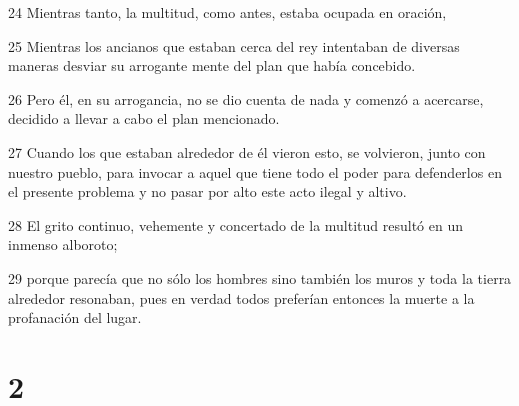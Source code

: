 \par 24 Mientras tanto, la multitud, como antes, estaba ocupada en oración,
\par 25 Mientras los ancianos que estaban cerca del rey intentaban de diversas maneras desviar su arrogante mente del plan que había concebido.
\par 26 Pero él, en su arrogancia, no se dio cuenta de nada y comenzó a acercarse, decidido a llevar a cabo el plan mencionado.
\par 27 Cuando los que estaban alrededor de él vieron esto, se volvieron, junto con nuestro pueblo, para invocar a aquel que tiene todo el poder para defenderlos en el presente problema y no pasar por alto este acto ilegal y altivo.
\par 28 El grito continuo, vehemente y concertado de la multitud resultó en un inmenso alboroto;
\par 29 porque parecía que no sólo los hombres sino también los muros y toda la tierra alrededor resonaban, pues en verdad todos preferían entonces la muerte a la profanación del lugar.

\chapter{2}


